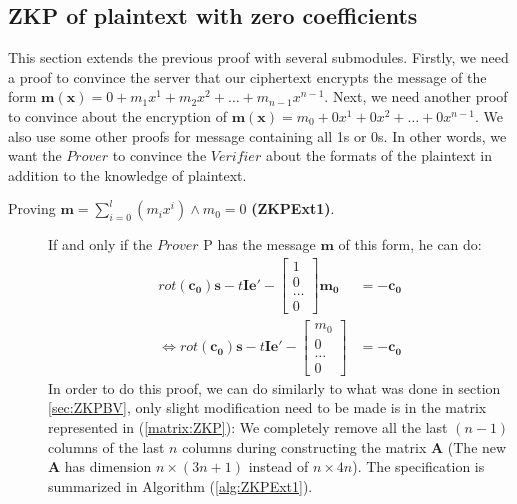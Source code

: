 \subsection{ZKP of plaintext with zero coefficients}
This section extends the previous proof with several submodules. Firstly, we
need a proof to convince the server that our ciphertext encrypts the message of the form $\mathbf{m(x)} =
0 + m_1x^1 + m_2x^2 + \dots + m_{n-1}x^{n-1}$. Next, we need another proof to convince about the encryption of
$\mathbf{m(x)} = m_0 + 0x^1 + 0x^2 + \dots + 0x^{n-1}$. We also use some other proofs for message containing all 1s or 0s. In other words, we want the $Prover$ to convince the $Verifier$
about the formats of the plaintext in addition to the knowledge of plaintext.

\begin{description}
\item[Proving $\mathbf{m}=\sum_{i = 0}^l(m_ix^i) \land m_0 = 0$ \textbf{(ZKPExt1)}.]
  If and only if the $Prover$ P has the message $\mathbf{m}$ of this form, he can do:
  \begin{align*}
    rot(\mathbf{c_0})\mathbf{s} -t\mathbf{Ie'} - \begin{bmatrix}
      1\\
      0\\
      \dots\\
      0
    \end{bmatrix}\mathbf{m_0} &= -\mathbf{c_0}\\
    \iff rot(\mathbf{c_0})\mathbf{s} -t\mathbf{Ie'} - \begin{bmatrix}
      m_0\\
      0\\
      \dots\\
      0
    \end{bmatrix} &= -\mathbf{c_0}
  \end{align*}
  In order to do this proof, we can do similarly to what was done in section \ref{sec:ZKPBV},
  only slight modification need to be made is in the matrix represented in (\ref{matrix:ZKP}):
  We completely remove all the last $(n-1)$ columns of the last $n$ columns during constructing the matrix $\mathbf{A}$ (The new $\mathbf{A}$ has dimension $n \times (3n + 1)$ instead of
  $n \times 4n$). The specification is summarized in Algorithm (\ref{alg:ZKPExt1}).


\end{description}
